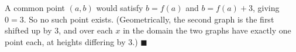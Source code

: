 A common point $(a,b)$ would satisfy $b=f(a)$ and $b=f(a)+3$, giving $0=3$. So no such point exists. (Geometrically, the second graph is the first shifted up by $3$, and over each $x$ in the domain the two graphs have exactly one point each, at heights differing by $3$.) $\blacksquare$

